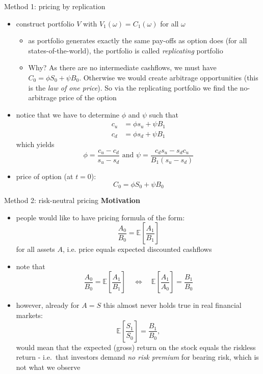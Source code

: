 \documentclass[pdf, handout]{beamer}
\begin{document}
\begin{frame}{Method 1: pricing by replication}
\begin{itemize}
\item construct portfolio $V$ with $V_1(\omega)=C_1(\omega)$ for all $\omega$
\begin{itemize}
\item as portfolio generates exactly the same pay-offs as option does (for all states-of-the-world), the portfolio is called \emph{replicating} portfolio
\item Why? As there are no intermediate cashflows, we must have $C_0 = \phi S_0 + \psi B_0$. Otherwise
we would create arbitrage opportunities (this is the \emph{law of one price}). So via the replicating portfolio we find the no-arbitrage price of the option
\end{itemize}
\item notice that we have to determine $\phi$ and $\psi$ such that
\begin{align*}
c_u&= \phi s_u + \psi B_1 \\
c_d&= \phi s_d + \psi B_1
\end{align*}
which yields
\[
\phi=\frac{ c_u -c_d}{s_u-s_d} \text{ and } \psi=\frac{c_d s_u - s_d c_u}{B_1(s_u-s_d)}
\]
\item price of option (at $t=0$):
\[
C_0=\phi S_0 + \psi B_0
\]
\end{itemize}
\end{frame}

\begin{frame}{Method 2: risk-neutral pricing}
\textbf{Motivation}
\begin{itemize}
\item
people would like to have pricing formula of the form:
\[
\frac{A_0}{B_0} = \mathbb{E}\left[ \frac{A_1}{B_1} \right]  
\]
for all assets $A$, i.e. price equals expected discounted cashflows
\item note that
\[
\frac{A_0}{B_0} = \mathbb{E}\left[ \frac{A_1}{B_1} \right] \quad \Longleftrightarrow\quad
 \mathbb{E}\left[ \frac{A_1}{A_0} \right] =\frac{B_1}{B_0}
\]
\item however, already for $A=S$ this almost never holds true in real
financial markets:
\[
 \mathbb{E}\left[ \frac{S_1}{S_0} \right] =\frac{B_1}{B_0},
\]
would mean that the expected (gross) return on the stock equals the riskless return - i.e.\ that investors demand \emph{no risk premium} for bearing risk, which is not what we observe
\end{itemize}
\end{frame}
\end{document}
